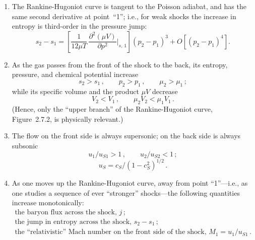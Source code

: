 \begin{enumerate}
\item[(i)] The Rankine-Hugoniot curve is tangent to the Poisson adiabat, and
  has the same second derivative at point~``1''; i.e., for weak shocks the
  increase in entropy is third-order in the pressure jump:
  \begin{equation}
    s_2 - s_1 = \left[\frac{1}{12\mu T}\,
      \frac{\partial^2(\mu V)}{\partial p^2}\bigg|_{s,\,1}\right]
      (p_2 - p_1)^3 + O\!\left[(p_2-p_1)^4\right].
    \tag{2.7.5}
  \end{equation}

\item[(ii)] As the gas passes from the front of the shock to the back, its
  entropy, pressure, and chemical potential increase
  \begin{equation}
    s_2 > s_1\,,\qquad p_2 > p_1\,,\qquad \mu_2 > \mu_1\,;
    \tag{2.7.6a}
  \end{equation}
  while its specific volume and the product $\mu V$ decrease
  \begin{equation}
    V_2 < V_1\,,\qquad \mu_2 V_2 < \mu_1 V_1\,.
    \tag{2.7.6b}
  \end{equation}
  (Hence, only the ``upper branch'' of the Rankine-Hugoniot curve,
  Figure~2.7.2, is physically relevant.)

\item[(iii)] The flow on the front side is always supersonic; on the back side
  is always subsonic
  \begin{equation}
    u_1/u_{S1} > 1\,,\qquad u_2/u_{S2} < 1\,;
    \tag{2.7.7}
  \end{equation}
  \[
    u_S = c_S/(1 - c_S^2)^{1/2}\,.
  \]

\item[(iv)] As one moves up the Rankine-Hugoniot curve, away from point
  ``1''---i.e., as one studies a sequence of ever ``stronger''
  shocks---the following quantities increase monotonically:
  \begin{equation}
  \begin{gathered}
    \text{the baryon flux across the shock, } j\,; \\
    \text{the jump in entropy across the shock, } s_2 - s_1\,; \\
    \text{the ``relativistic'' Mach number on the front side of the shock, }
      M_1 = u_1/u_{S1}\,.
  \end{gathered}
    \tag{2.7.8}
  \end{equation}
\end{enumerate}

